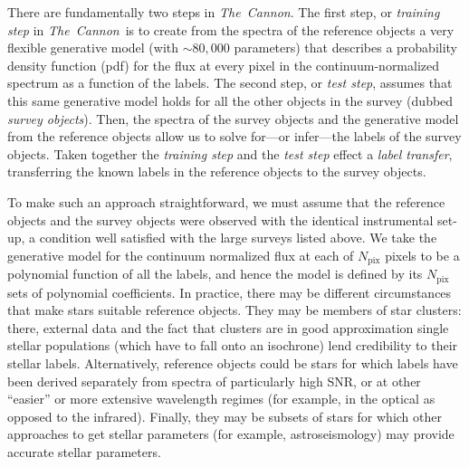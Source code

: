 \documentclass[12pt, preprint]{aastex}
\newcommand{\tc}{\textsl{The~Cannon}}
\newcommand{\pix}{\mathrm{pix}}
\begin{document}
There are fundamentally two steps in \tc. 
The first step, or \textit{training step} in \tc\ is to create from the spectra of the reference objects a very flexible generative model (with $\sim 80,000$ parameters) that describes a probability density function (pdf) for the flux at every pixel in the continuum-normalized spectrum as a function of the labels.
The second step, or \textit{test step}, assumes that this same generative model holds for all the other objects in the survey (dubbed \textit{survey objects}). 
Then, the spectra of the survey objects and the generative model from the reference objects
allow us to solve for---or infer---the labels of the survey objects. 
Taken together the \textit{training step} and the \textit{test step} effect a \textit{label transfer},
transferring the known labels in the reference objects to the survey objects.

To make such an approach straightforward, we must assume that the reference objects and the survey objects were observed with the identical instrumental set-up, a condition well satisfied with the large surveys listed above. 
We take the generative model for the continuum normalized flux at each of $N_\pix$ pixels to be a polynomial function of all the labels, and hence the model is defined by its $N_\pix$ sets of polynomial coefficients. In practice, there may be different circumstances that make stars suitable reference objects. 
They may be members of star clusters: there, external data and the fact that clusters are in good approximation single stellar populations (which have to fall onto an isochrone) lend credibility to their stellar labels. 
Alternatively, reference objects could be stars for which labels have been derived separately from spectra of particularly high SNR, or at other ``easier'' or more extensive wavelength regimes (for example, in the optical as opposed to the infrared). 
Finally, they may be subsets of stars for which other approaches to get stellar parameters (for example, astroseismology) may provide accurate stellar parameters.
\end{document}
